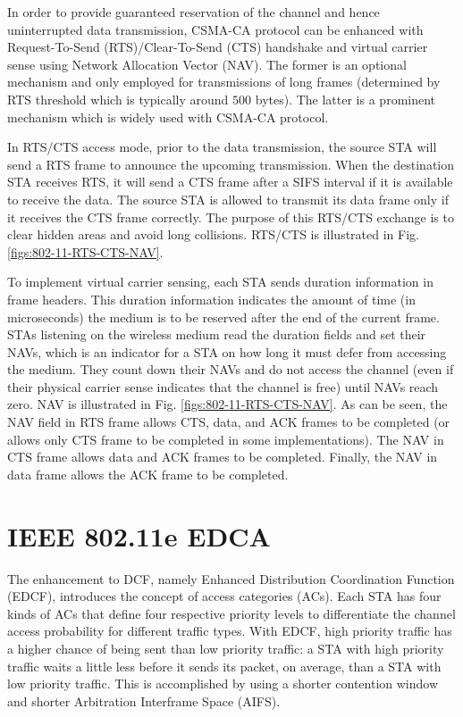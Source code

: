 In order to provide guaranteed reservation of the channel and hence uninterrupted data transmission, CSMA-CA protocol can be enhanced with Request-To-Send (RTS)/Clear-To-Send (CTS) handshake and virtual carrier sense using Network Allocation Vector (NAV). The former is an optional mechanism and only employed for transmissions of long frames (determined by RTS threshold which is typically around $500$ bytes). The latter is a prominent mechanism which is widely used with CSMA-CA protocol.

In RTS/CTS access mode, prior to the data transmission, the source STA will send a RTS frame to announce the upcoming transmission. When the destination STA receives RTS, it will send a CTS frame after a SIFS interval if it is available to receive the data. The source STA is allowed to transmit its data frame only if it receives the CTS frame correctly. The purpose of this RTS/CTS exchange is to clear hidden areas and avoid long collisions. RTS/CTS is illustrated in Fig. \ref{figs:802-11-RTS-CTS-NAV}.

To implement virtual carrier sensing, each STA sends duration information in frame headers. This duration information indicates the amount of time (in microseconds) the medium is to be reserved after the end of the current frame. STAs listening on the wireless medium read the duration fields and set their NAVs, which is an indicator for a STA on how long it must defer from accessing the medium. They count down their NAVs and do not access the channel (even if their physical carrier sense indicates that the channel is free) until NAVs reach zero. NAV is illustrated in Fig. \ref{figs:802-11-RTS-CTS-NAV}. As can be seen, the NAV field in RTS frame allows CTS, data, and ACK frames to be completed (or allows only CTS frame to be completed in some implementations). The NAV in CTS frame allows data and ACK frames to be completed. Finally, the NAV in data frame allows the ACK frame to be completed.

\section{IEEE 802.11e EDCA}
\label{80211e}
The enhancement to DCF, namely Enhanced Distribution Coordination Function (EDCF), introduces the concept of access categories (ACs). Each STA has four kinds of ACs that define four respective priority levels to differentiate the channel access probability for different traffic types. With EDCF, high priority traffic has a higher chance of being sent than low priority traffic: a STA with high priority traffic waits a little less before it sends its packet, on average, than a STA with low priority traffic. This is accomplished by using a shorter contention window and shorter Arbitration Interframe Space (AIFS).

